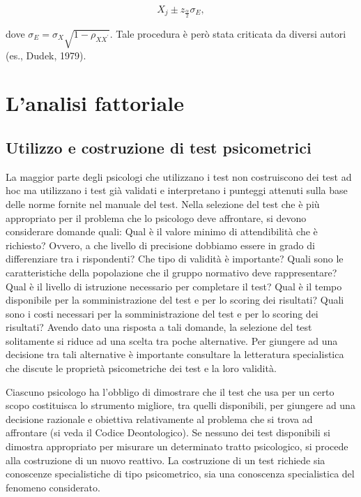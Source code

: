 \documentclass[
  11pt,
]{krantz}
\theoremstyle{definition}
\theoremstyle{definition}
\theoremstyle{definition}
\theoremstyle{definition}
\theoremstyle{remark}
\begin{document}
\[
X_j \pm z_{\frac{\alpha}{2}} \sigma_E,
\]

dove \(\sigma_E = \sigma_X \sqrt{1 -\rho_{XX^\prime}}\). Tale procedura è però stata criticata da diversi autori (es., Dudek, 1979).

\hypertarget{part-lanalisi-fattoriale}{%
\part{L'analisi fattoriale}\label{part-lanalisi-fattoriale}}

\hypertarget{ch:sviluppo}{%
\chapter{Utilizzo e costruzione di test psicometrici}\label{ch:sviluppo}}

La maggior parte degli psicologi che utilizzano i test non costruiscono dei test ad hoc ma utilizzano i test già validati e interpretano i punteggi attenuti sulla base delle norme fornite nel manuale del test. Nella selezione del test che è più appropriato per il problema che lo psicologo deve affrontare, si devono considerare domande quali: Qual è il valore minimo di attendibilità che è richiesto? Ovvero, a che livello di precisione dobbiamo essere in grado di differenziare tra i rispondenti? Che tipo di validità è importante? Quali sono le caratteristiche della popolazione che il gruppo normativo deve rappresentare? Qual è il livello di istruzione necessario per completare il test? Qual è il tempo disponibile per la somministrazione del test e per lo scoring dei risultati? Quali sono i costi necessari per la somministrazione del test e per lo scoring dei risultati? Avendo dato una risposta a tali domande, la selezione del test solitamente si riduce ad una scelta tra poche alternative. Per giungere ad una decisione tra tali alternative è importante consultare la letteratura specialistica che discute le proprietà psicometriche dei test e la loro validità.

Ciascuno psicologo ha l'obbligo di dimostrare che il test che usa per un certo scopo costituisca lo strumento migliore, tra quelli disponibili, per giungere ad una decisione razionale e obiettiva relativamente al problema che si trova ad affrontare (si veda il Codice Deontologico). Se nessuno dei test disponibili si dimostra appropriato per misurare un determinato tratto psicologico, si procede alla costruzione di un nuovo reattivo. La costruzione di un test richiede sia conoscenze specialistiche di tipo psicometrico, sia una conoscenza specialistica del fenomeno considerato.
\end{document}
